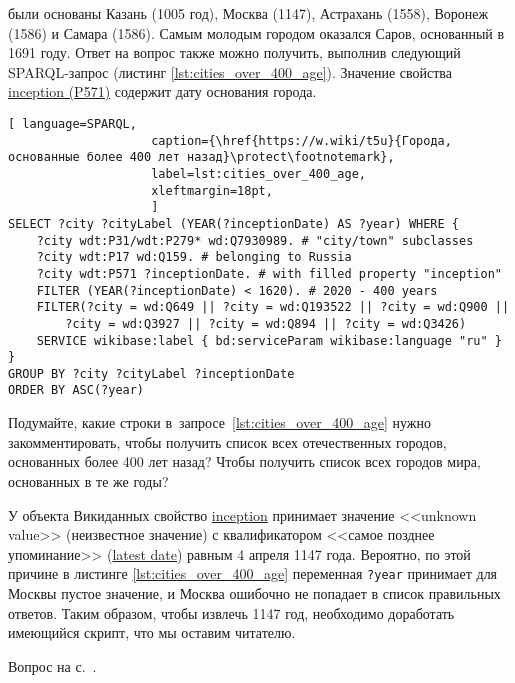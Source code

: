 \begin{task}
    \label{answer:cities_over_400_age}
     были основаны Казань (1005 год), Москва (1147), Астрахань (1558), Воронеж (1586) и Самара (1586). Самым молодым городом оказался Саров, основанный в 1691 году. Ответ на вопрос также можно получить, выполнив следующий SPARQL-запрос (листинг \ref{lst:cities_over_400_age}). Значение свойства \href{https://www.wikidata.org/wiki/Property:P571}{inception (P571)} содержит дату основания города.

    
    \begin{lstlisting}[ language=SPARQL, 
                    caption={\href{https://w.wiki/t5u}{Города, основанные более 400 лет назад}\protect\footnotemark},
                    label=lst:cities_over_400_age,
                    xleftmargin=18pt, 
                    ]
SELECT ?city ?cityLabel (YEAR(?inceptionDate) AS ?year) WHERE {
	?city wdt:P31/wdt:P279* wd:Q7930989. # "city/town" subclasses
	?city wdt:P17 wd:Q159. # belonging to Russia
	?city wdt:P571 ?inceptionDate. # with filled property "inception"  
	FILTER (YEAR(?inceptionDate) < 1620). # 2020 - 400 years
	FILTER(?city = wd:Q649 || ?city = wd:Q193522 || ?city = wd:Q900 ||
		?city = wd:Q3927 || ?city = wd:Q894 || ?city = wd:Q3426)
	SERVICE wikibase:label { bd:serviceParam wikibase:language "ru" }
}
GROUP BY ?city ?cityLabel ?inceptionDate
ORDER BY ASC(?year)
\end{lstlisting}

Подумайте, какие строки в~запросе~\ref{lst:cities_over_400_age} нужно закомментировать, 
    чтобы получить список всех отечественных городов, основанных более 400 лет назад?
	Чтобы получить список всех городов мира, основанных в те же годы?





У объекта Викиданных  
    свойство \href{https://www.wikidata.org/wiki/Property:P571}{inception} 
    принимает значение <<unknown value>> (неизвестное значение) 
    с квалификатором <<самое позднее упоминание>> 
    (\href{https://www.wikidata.org/wiki/Property:P1326}{latest date}) равным 4 апреля 1147 года. 
    Вероятно, по этой причине в листинге \ref{lst:cities_over_400_age} 
    переменная \lstinline|?year| принимает для Москвы пустое значение, 
    и Москва ошибочно не попадает в список правильных ответов. 
    Таким образом, чтобы извлечь 1147 год, необходимо доработать имеющийся скрипт, что мы оставим читателю. 



    \small{\AnswerBackref Вопрос на с.~\pageref{fig:city_relation_Russia_S_N}.}
\end{task}

